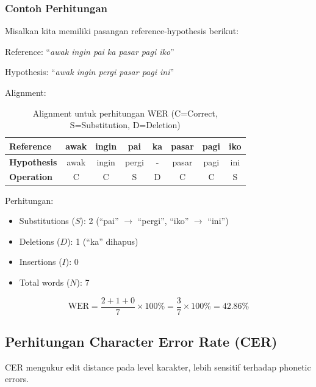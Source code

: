 \subsubsection{Contoh Perhitungan}

Misalkan kita memiliki pasangan reference-hypothesis berikut:

Reference: ``\textit{awak ingin pai ka pasar pagi iko}''

Hypothesis: ``\textit{awak ingin pergi pasar pagi ini}''

Alignment:
\begin{table}[H]
\centering
\renewcommand{\arraystretch}{1.5}
\begin{tabular}{|l|c|c|c|c|c|c|c|}
\hline
\textbf{Reference} & awak & ingin & pai & ka & pasar & pagi & iko \\
\hline
\textbf{Hypothesis} & awak & ingin & pergi & - & pasar & pagi & ini \\
\hline
\textbf{Operation} & C & C & S & D & C & C & S \\
\hline
\end{tabular}
\caption{Alignment untuk perhitungan WER (C=Correct, S=Substitution, D=Deletion)}
\end{table}

Perhitungan:
\begin{itemize}[noitemsep]
    \item Substitutions ($S$): 2 (``pai'' $\rightarrow$ ``pergi'', ``iko'' $\rightarrow$ ``ini'')
    \item Deletions ($D$): 1 (``ka'' dihapus)
    \item Insertions ($I$): 0
    \item Total words ($N$): 7
\end{itemize}

\vspace{0.3cm}
\begin{equation}
\label{eq:wer_example}
\text{WER} = \frac{2 + 1 + 0}{7} \times 100\% = \frac{3}{7} \times 100\% = 42.86\%
\end{equation}
\vspace{0.2cm}

\subsection{Perhitungan Character Error Rate (CER)}
\label{III.Ilustrasi_CER}

CER mengukur edit distance pada level karakter, lebih sensitif terhadap phonetic errors.


